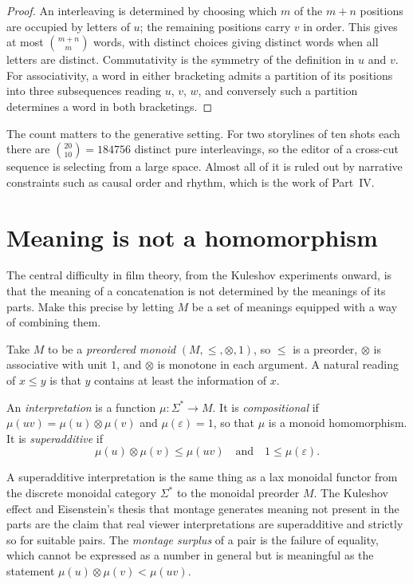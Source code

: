 \begin{proof}
An interleaving is determined by choosing which $m$ of the $m+n$ positions are occupied by letters of $u$; the remaining positions carry $v$ in order. This gives at most $\binom{m+n}{m}$ words, with distinct choices giving distinct words when all letters are distinct. Commutativity is the symmetry of the definition in $u$ and $v$. For associativity, a word in either bracketing admits a partition of its positions into three subsequences reading $u$, $v$, $w$, and conversely such a partition determines a word in both bracketings.
\end{proof}

The count matters to the generative setting. For two storylines of ten shots each there are $\binom{20}{10}=184756$ distinct pure interleavings, so the editor of a cross-cut sequence is selecting from a large space. Almost all of it is ruled out by narrative constraints such as causal order and rhythm, which is the work of Part~IV.

\section{Meaning is not a homomorphism}

The central difficulty in film theory, from the Kuleshov experiments onward, is that the meaning of a concatenation is not determined by the meanings of its parts. Make this precise by letting $M$ be a set of meanings equipped with a way of combining them.

Take $M$ to be a \emph{preordered monoid} $(M,\le,\otimes,1)$, so $\le$ is a preorder, $\otimes$ is associative with unit $1$, and $\otimes$ is monotone in each argument. A natural reading of $x\le y$ is that $y$ contains at least the information of $x$.

\begin{definition}
An \emph{interpretation} is a function $\mu:\Sigma^*\to M$. It is \emph{compositional} if $\mu(uv)=\mu(u)\otimes\mu(v)$ and $\mu(\varepsilon)=1$, so that $\mu$ is a monoid homomorphism. It is \emph{superadditive} if
\[
\mu(u)\otimes\mu(v)\le\mu(uv)\quad\text{and}\quad1\le\mu(\varepsilon).
\]
\end{definition}

A superadditive interpretation is the same thing as a lax monoidal functor from the discrete monoidal category $\Sigma^*$ to the monoidal preorder $M$. The Kuleshov effect and Eisenstein's thesis that montage generates meaning not present in the parts are the claim that real viewer interpretations are superadditive and strictly so for suitable pairs. The \emph{montage surplus} of a pair is the failure of equality, which cannot be expressed as a number in general but is meaningful as the statement $\mu(u)\otimes\mu(v)<\mu(uv)$.


